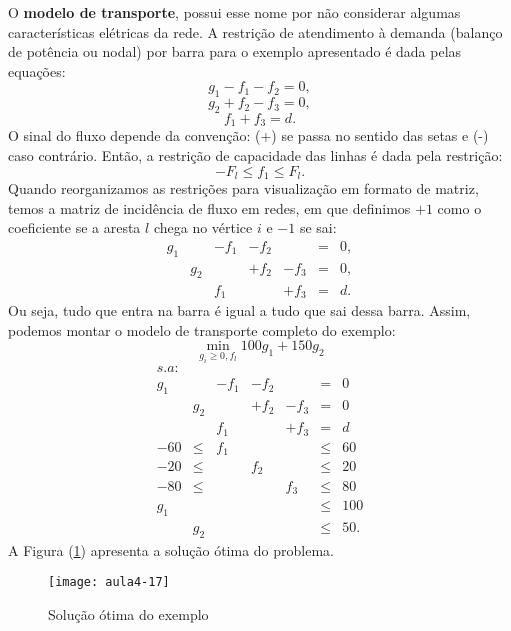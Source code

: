 O \textbf{modelo de transporte}, possui esse nome por não considerar algumas características elétricas da rede. A restrição de atendimento à demanda (balanço de potência ou nodal) por barra para o exemplo apresentado é dada pelas equações:
\[
	g_{1}-f_{1}-f_{2}=0,
\]
\[
	g_{2}+f_{2}-f_{3}=0,
\]
\[
	f_{1}+f_{3}=d.
\]
O sinal do fluxo depende da convenção: (+) se passa no sentido das setas e (-) caso contrário.
Então, a restrição de capacidade das linhas é dada pela restrição:
\[
-F_{l}\leq f_{1}\leq F_{l}.
\]
Quando reorganizamos as restrições para visualização em formato de matriz, temos a matriz de incidência de fluxo em redes, em que definimos $+1$ como o coeficiente se a aresta $l$ chega
no vértice $i$ e $-1$ se sai:
\[
\begin{array}{ccccccc}
g_{1} &  & -f_{1} & -f_{2} &  & = & 0,\\
 & g_{2} &  & +f_{2} & -f_{3} & = & 0,\\
 &  & f_{1} &  & +f_{3} & = & d.
\end{array}
\]
Ou seja, tudo que entra na barra é igual a tudo que sai dessa barra.
Assim, podemos montar o modelo de transporte completo do exemplo:
\[
	\min_{g_{i}\geq0,f_{l}}100g_{1}+150g_{2}
\]
\[
\begin{array}{ccccccc}
s.a:\\
g_{1} &  & -f_{1} & -f_{2} &  & = & 0\\
 & g_{2} &  & +f_{2} & -f_{3} & = & 0\\
 &  & f_{1} &  & +f_{3} & = & d\\
-60 & \leq & f_{1} &  &  & \leq & 60\\
-20 & \leq &  & f_{2} &  & \leq & 20\\
-80 & \leq &  &  & f_{3} & \leq & 80\\
g_{1} &  &  &  &  & \leq & 100\\
 & g_{2} &  &  &  & \leq & 50.
\end{array}
\]
A Figura (\ref{fig:aula4-17}) apresenta a solução ótima do problema.
\begin{figure}[H]
\begin{centering}
\texttt{[image: aula4-17]}\protect\caption{\label{fig:aula4-17} Solução ótima do exemplo}
\end{centering}
\end{figure}


